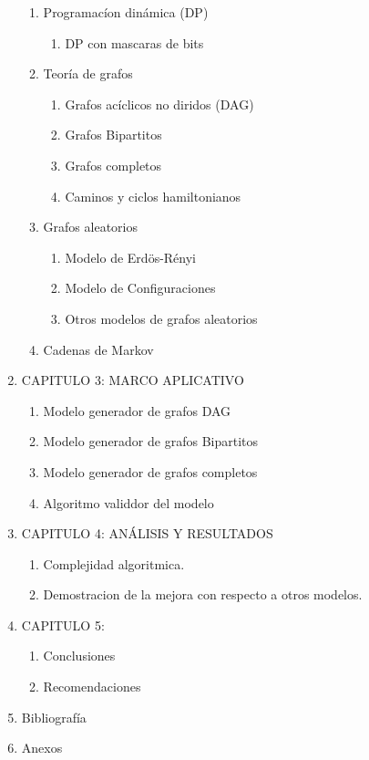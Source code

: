 \documentclass[11pt]{extarticle}
\begin{document}
\begin{enumerate}
\begin{enumerate}
        \item Programac\'ion din\'amica (DP)
        \begin{enumerate}
          \item DP con mascaras de bits
        \end{enumerate}
        \item Teor\'ia de grafos
        \begin{enumerate}
          \item Grafos ac\'iclicos no diridos (DAG)
          \item Grafos Bipartitos
          \item Grafos completos
          \item Caminos y ciclos hamiltonianos
        \end{enumerate}
        \item{Grafos aleatorios}
        \begin{enumerate}
          \item Modelo de Erdös-Rényi
          \item Modelo de Configuraciones
          \item Otros modelos de grafos aleatorios
        \end{enumerate}
        \item Cadenas de Markov
      \end{enumerate}
    \item CAPITULO 3: MARCO APLICATIVO
      \begin{enumerate}
        \item Modelo generador de grafos DAG
        \item Modelo generador de grafos Bipartitos 
        \item Modelo generador de grafos completos
        \item Algoritmo validdor del modelo
      \end{enumerate}
    \item CAPITULO 4: AN\'ALISIS Y RESULTADOS
      \begin{enumerate}
        \item Complejidad algoritmica.
        \item Demostracion de la mejora con respecto a otros modelos.
      \end{enumerate}
    \item CAPITULO 5:
      \begin{enumerate}
        \item Conclusiones
        \item Recomendaciones
      \end{enumerate}
    \item Bibliograf\'ia
    \item Anexos
  \end{enumerate}
\end{document}
